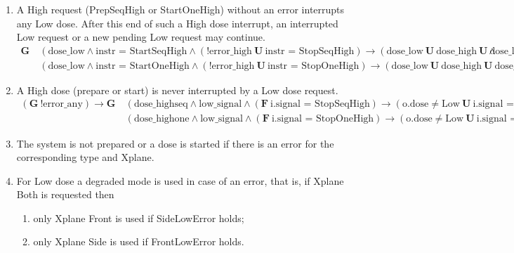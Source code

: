 \documentclass[a4paper,10pt]{article}
\newcommand{\LTLG}{\mathbf{G~}}
\newcommand{\LTLF}{\mathbf{F~}}
\newcommand{\LTLU}{\mathbf{~U~}}
\newcommand{\imply}{\rightarrow}
\newcommand{\doselow}{\textrm{dose\_low}}
\newcommand{\dosehigh}{\textrm{dose\_high}}
\newcommand{\dosehighseq}{\textrm{dose\_highseq}}
\newcommand{\dosehighone}{\textrm{dose\_highone}}
\newcommand{\lowsignal}{\textrm{low\_signal}}
\newcommand{\errorany}{\textrm{error\_any}}
\newcommand{\errorhigh}{\textrm{error\_high}}
\begin{document}
\begin{enumerate}
		\item A High request (PrepSeqHigh or StartOneHigh) without an error interrupts any Low dose. After this end of such a High dose interrupt, an interrupted Low request or a new pending Low request may continue.
			\begin{align*}
				\LTLG & (\doselow \land \textrm{instr = StartSeqHigh} \land (!\errorhigh \LTLU \textrm{instr = StopSeqHigh}) \imply (\doselow \LTLU \dosehigh \LTLU \doselow)) \land \\
					&(\doselow \land \textrm{instr = StartOneHigh} \land (!\errorhigh \LTLU \textrm{instr = StopOneHigh}) \imply (\doselow \LTLU \dosehigh \LTLU \doselow))
			\end{align*}

		\item A High dose (prepare or start) is never interrupted by a Low dose request.
			\begin{align*}
				(\LTLG !\errorany) \imply \LTLG & (\dosehighseq \land \lowsignal \land (\LTLF \textrm{i.signal = StopSeqHigh}) \imply (\textrm{o.dose} \neq \textrm{Low} \LTLU \textrm{i.signal = StopSeqHigh})) \land \\
					& (\dosehighone \land \lowsignal \land (\LTLF \textrm{i.signal = StopOneHigh}) \imply (\textrm{o.dose} \neq \textrm{Low} \LTLU \textrm{i.signal = StopOneHigh}))
			\end{align*}
	
		\item The system is not prepared or a dose is started if there is an error for the corresponding type and Xplane.
		\item For Low dose a degraded mode is used in case of an error, that is, if Xplane Both is requested then
			\begin{enumerate}
				\item only Xplane Front is used if SideLowError holds;
				\item only Xplane Side is used if FrontLowError holds.
			

\end{enumerate}
\end{enumerate}
\end{document}
